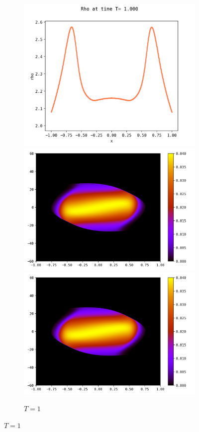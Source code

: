 \documentclass{article}
\numberwithin{equation}{section}
\newcommand{\mysubcaption}[1]{
	\vspace*{5pt}
	\begin{minipage}{0.8\linewidth}
		\begin{center}
			\footnotesize\emph{#1}
		\end{center}
	\end{minipage}
}
\newcommand{\imh}{\textheight} %
\newcommand{\imw}{\textwidth} %
\begin{document}
\begin{figure}
	\centering
	\newcommand{\rootSL}{../code_SL/}
	\newcommand{\rootFD}{../temp_res_DF/}
	\newcommand{\dirSL}{run_comp_long_time_2sp_Nx1000_Nvi2001_Nve2001_Nt100000}
	\newcommand{\dirFD}{run_comp_long_time_2sp_Nx200_Nv400_Nt2500000}
	
	\renewcommand{\imh}{0.24\textheight}
	\renewcommand{\imw}{0.45\linewidth}
	
	\begin{subfigure}{\textwidth}
		\centering
		\includegraphics[height=\imh,width=0.3\linewidth]{images/rhoT1.png}
		\includegraphics[height=\imh,width=0.3\linewidth]{images/feT1.png}
		\includegraphics[height=\imh,width=0.3\linewidth]{images/feT1_run_job2.png}
		\caption{$T=1$}
	\end{subfigure}


\end{figure}
\end{document}
